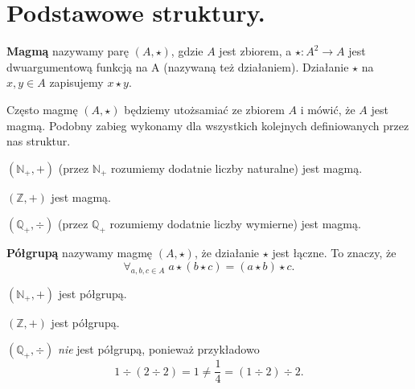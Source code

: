 \section{Podstawowe struktury.}

\begin{definition}
	\textbf{Magmą} nazywamy parę $(A, \star)$, gdzie $A$ jest zbiorem, a $\star: A^2 \to A$ jest dwuargumentową funkcją na A (nazywaną też działaniem). Działanie $\star$ na $x, y \in A$ zapisujemy $x \star y$.
\end{definition}
Często magmę $(A, \star)$ będziemy utożsamiać ze zbiorem $A$ i mówić, że $A$ jest magmą.
Podobny zabieg wykonamy dla wszystkich kolejnych definiowanych przez nas struktur.

\begin{example}
	$(\mathbb{N}_+, +)$ (przez $\mathbb{N}_+$ rozumiemy dodatnie liczby naturalne) jest magmą.
\end{example}

\begin{example}
	$(\mathbb{Z}, +)$ jest magmą.
\end{example}

\begin{example}
	$(\mathbb{Q}_+, \div)$ (przez $\mathbb{Q}_+$ rozumiemy dodatnie liczby wymierne) jest magmą.
\end{example}

\begin{definition}
	\textbf{Półgrupą} nazywamy magmę $(A, \star)$, że działanie $\star$ jest łączne. To znaczy, że
	\begin{equation*}
		\forall_{a,b,c \in A}\; a \star (b \star c) = (a \star b) \star c.
	\end{equation*}
\end{definition}

\begin{example}
	$(\mathbb{N}_+, +)$ jest półgrupą.
\end{example}

\begin{example}
	$(\mathbb{Z}, +)$ jest półgrupą.
\end{example}

\begin{example}
	$(\mathbb{Q}_+, \div)$ \textit{nie} jest półgrupą, ponieważ przykładowo
	\begin{equation*}
		1 \div (2 \div 2) = 1 \neq \frac{1}{4} = (1\div2)\div2.
	\end{equation*}
\end{example}

